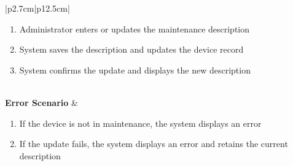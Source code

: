 \begin{table}[H]
\begin{tabular}{|p{2.7cm}|p{12.5cm}|}
\begin{minipage}[t]{\linewidth}
\begin{enumerate}[topsep=0pt,itemsep=1pt,parsep=0pt,partopsep=0pt]
                                          \item Administrator enters or updates the maintenance description
                                          \item System saves the description and updates the device record
                                          \item System confirms the update and displays the new description
                                      \end{enumerate}
                                  \end{minipage}               \\
        \hline
        \textbf{Error Scenario} & \begin{minipage}[t]{\linewidth}
                                      \begin{enumerate}[topsep=0pt,itemsep=1pt,parsep=0pt,partopsep=0pt]
                                          \item If the device is not in maintenance, the system displays an error
                                          \item If the update fails, the system displays an error and retains the current
                                                description
                                      \end{enumerate}
                                  \end{minipage} \\
        \hline
    \end{tabular}
    \label{tab:admin-set-usb-maintenance-description}
\end{table}
